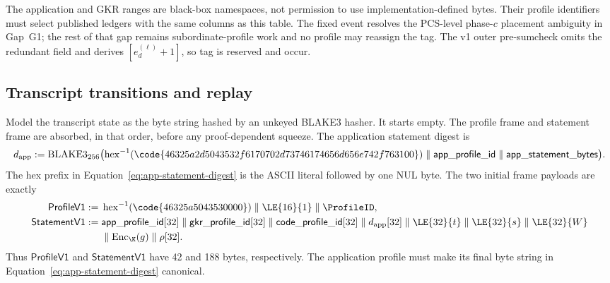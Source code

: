The application and GKR ranges are black-box namespaces, not permission to
use implementation-defined bytes.  Their profile identifiers must select
published ledgers with the same columns as this table.  The fixed
 event resolves the PCS-level phase-$c$ placement ambiguity in
Gap~G1; the rest of that gap remains subordinate-profile work and no profile
may reassign the tag.  The v1 outer pre-sumcheck
omits the redundant  field and derives
$[e_d^{(\ell)}+1]$, so tag  is reserved and \mustnot{} occur.

\subsection{Transcript transitions and replay}
\label{sec:wire-transcript}

Model the transcript state as the byte string hashed by an unkeyed BLAKE3
hasher.  It starts empty.  The profile frame  and statement frame
 are absorbed, in that order, before any proof-dependent squeeze.
The application statement digest is
\begin{equation}
 d_{\rm app}:=\operatorname{BLAKE3}_{256}
 \bigl(\operatorname{hex}^{-1}
   (\code{46325a2d5043532f6170702d73746174656d656e742f763100})
 \parallel\mathsf{app\_profile\_id}\parallel
 \mathsf{app\_statement\_bytes}\bigr).
 \label{eq:app-statement-digest}
\end{equation}
The hex prefix in Equation~\eqref{eq:app-statement-digest} is the ASCII
literal  followed by one NUL byte.  The two
initial frame payloads are exactly
\begin{equation}
 \begin{aligned}
  \mathsf{ProfileV1}:={}&
    \operatorname{hex}^{-1}(\code{46325a5043530000})
    \parallel\LE{16}{1}\parallel\ProfileID,\\
  \mathsf{StatementV1}:={}&
    \mathsf{app\_profile\_id}[32]\parallel
    \mathsf{gkr\_profile\_id}[32]\parallel
    \mathsf{code\_profile\_id}[32]\parallel d_{\rm app}[32]
    \parallel\LE{32}{t}\parallel\LE{32}{s}\parallel\LE{32}{W}\\
    &\parallel\operatorname{Enc}_{\K}(g)\parallel\rho[32].
 \end{aligned}
 \label{eq:profile-statement-payloads}
\end{equation}
Thus $\mathsf{ProfileV1}$ and $\mathsf{StatementV1}$ have 42 and 188 bytes,
respectively.  The application profile must make its final byte string in
Equation~\eqref{eq:app-statement-digest} canonical.

